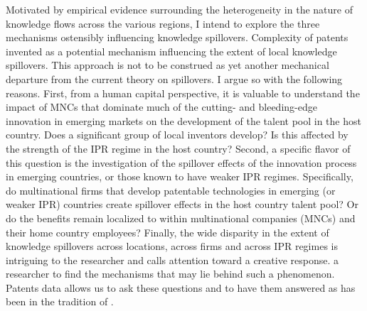 \documentclass[12pt]{article}
\begin{document}
Motivated by empirical evidence surrounding the heterogeneity in the nature of knowledge flows across the various regions, I intend to explore the three mechanisms ostensibly influencing knowledge spillovers. Complexity of patents invented as a potential mechanism influencing the extent of local knowledge spillovers. This approach is not to be construed as yet another mechanical departure from the current theory on spillovers. I argue so with the following reasons.  First, from a human capital perspective, it is valuable to understand the impact of MNCs that dominate much of the cutting- and bleeding-edge innovation in emerging markets on the development of the talent pool in the host country. Does a significant group of local inventors develop? Is this affected by the strength of the IPR regime in the host country? Second, a specific flavor of this question is the investigation of the spillover effects of the innovation process in emerging countries, or those known to have weaker IPR regimes. Specifically, do multinational firms that develop patentable technologies in emerging (or weaker IPR) countries create spillover effects in the host country talent pool? Or do the benefits remain localized to within multinational companies (MNCs) and their home country employees?  Finally, the wide disparity in the extent of knowledge spillovers across locations, across firms and across IPR regimes is intriguing to the researcher and calls attention toward a creative response.  a researcher to find the mechanisms that may lie behind such a phenomenon. Patents data allows us to ask these questions and to have them answered as has been in the tradition of \cite{Jaffe1993}.
\end{document}
